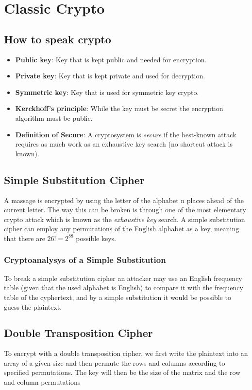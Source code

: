 \documentclass[a4paper]{article}
\begin{document}
\newpage
\section{Classic Crypto}

\subsection{How to speak crypto}
\begin{itemize}
    \item \textbf{Public key}: Key that is kept public and needed for encryption.
    \item \textbf{Private key}: Key that is kept private and used for decryption.
    \item \textbf{Symmetric key}: Key that is used for symmetric key crypto.
    \item \textbf{Kerckhoff's principle}: While the key must be secret the encryption algorithm must be public.
    \item \textbf{Definition of Secure}: A cryptosystem is \textit{secure} if the best-known attack requires as much work as an exhaustive key search (no shortcut attack is known).
\end{itemize}

\subsection{Simple Substitution Cipher}
A massage is encrypted by using the letter of the alphabet n places ahead of the current letter. The way this can be broken is through one of the most elementary crypto attack which is known as the \textit{exhaustive key} search. A simple substitution cipher can employ any permutations of the English alphabet as a key, meaning that there are $26! = 2^{88}$ possible keys.

\subsubsection{Cryptoanalysys of a Simple Substitution}
To break a simple substitution cipher an attacker may use an English frequency table (given that the used alphabet is English) to compare it with the frequency table of the cyphertext, and by a simple substitution it would be possible to guess the plaintext. 

\subsection{Double Transposition Cipher}
To encrypt with a double transposition cipher, we first write the plaintext into an array of a given size and then permute the rows and columns according to specified permutations. The key will then be the size of the matrix and the row and column permutations
\end{document}
